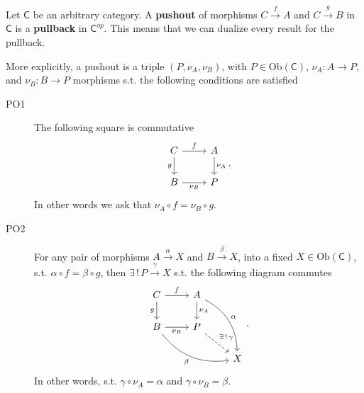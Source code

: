 \begin{defn}[Pushout]
	Let $\mathsf{C}$ be an arbitrary category.
	A \textbf{pushout} of morphisms $C \xrightarrow{f} A$ and $C \xrightarrow{g} B$ in $\mathsf{C}$ is a \textbf{pullback} in $\mathsf{C}^{op}$.
	This means that we can dualize every result for the pullback.

	More explicitly, a pushout is a triple $ \left(P, \nu_A, \nu_B \right)$, with $P \in \mathrm{Ob} \left(\mathsf{C}\right)$, $\nu_A: A \to P$,  and $\nu_B: B \to P$ morphisms s.t. the following conditions are satisfied
	\begin{description}
		\item[PO1] The following square is commutative
			\begin{equation}
			\begin{tikzcd}
				C \arrow[r, "f", rightarrow] \arrow[d, "g"', rightarrow] &
				A \arrow[d, "\nu_A", rightarrow] \\
				B \arrow[r, "\nu_B"', rightarrow] &
				P
			\end{tikzcd}
			.\end{equation} 
			In other words we ask that $\nu_A \circ f = \nu_B \circ g$.
		\item[PO2] For any pair of morphisms $A \xrightarrow{\alpha} X$ and $B \xrightarrow{\beta} X$, into a fixed $X \in \mathrm{Ob} \left(\mathsf{C}\right)$, s.t. $\alpha \circ f = \beta \circ g$, then
			$\exists\, !\, P \xrightarrow{\gamma} X$ s.t. the following diagram commutes
			\begin{equation}
			\begin{tikzcd}
				C \arrow[r, "f", rightarrow] \arrow[d, "g"', rightarrow] &
				A \arrow[d, "\nu_A", rightarrow] \arrow[rdd, "\alpha", rightarrow, bend left] & \\
				B \arrow[r, "\nu_B"', rightarrow] \arrow[rrd, "\beta"', rightarrow, bend right] &
				P \arrow[rd, "\exists\, !\, \gamma", dashrightarrow] & \\
				& & X
			\end{tikzcd}
			.\end{equation} 			
			In other words, s.t. $\gamma \circ \nu_A = \alpha$ and $\gamma \circ \nu_B = \beta$.
	\end{description} 
\end{defn}
		
